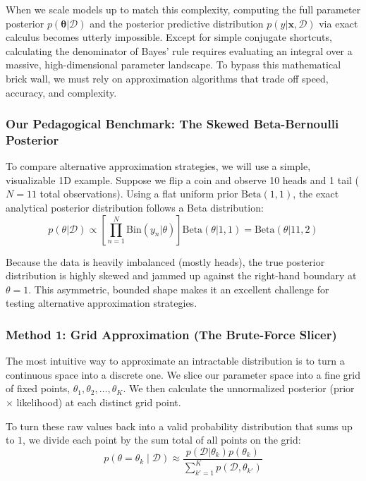 \documentclass{article}
\begin{document}
When we scale models up to match this complexity, computing the full parameter posterior $p(\boldsymbol{\theta}|\mathcal{D})$ and the posterior predictive distribution $p(y|\mathbf{x}, \mathcal{D})$ via exact calculus becomes utterly impossible. Except for simple conjugate shortcuts, calculating the denominator of Bayes' rule requires evaluating an integral over a massive, high-dimensional parameter landscape. To bypass this mathematical brick wall, we must rely on approximation algorithms that trade off speed, accuracy, and complexity.

\subsubsection{Our Pedagogical Benchmark: The Skewed Beta-Bernoulli Posterior}
To compare alternative approximation strategies, we will use a simple, visualizable 1D example. Suppose we flip a coin and observe 10 heads and 1 tail ($N = 11$ total observations). Using a flat uniform prior $\text{Beta}(1,1)$, the exact analytical posterior distribution follows a Beta distribution:
\begin{equation}
p(\theta|\mathcal{D}) \propto \left[ \prod_{n=1}^{N} \text{Bin}(y_n|\theta) \right] \text{Beta}(\theta|1, 1) = \text{Beta}(\theta|11, 2)
\end{equation}

Because the data is heavily imbalanced (mostly heads), the true posterior distribution is highly skewed and jammed up against the right-hand boundary at $\theta = 1$. This asymmetric, bounded shape makes it an excellent challenge for testing alternative approximation strategies.

\subsubsection{Method 1: Grid Approximation (The Brute-Force Slicer)}
The most intuitive way to approximate an intractable distribution is to turn a continuous space into a discrete one. We slice our parameter space into a fine grid of fixed points, $\theta_1, \theta_2, \dots, \theta_K$. We then calculate the unnormalized posterior (prior $\times$ likelihood) at each distinct grid point.

To turn these raw values back into a valid probability distribution that sums up to $1$, we divide each point by the sum total of all points on the grid:
\begin{equation}
p(\theta = \theta_k \mid \mathcal{D}) \approx \frac{p(\mathcal{D}|\theta_k)p(\theta_k)}{\sum_{k'=1}^{K} p(\mathcal{D}, \theta_{k'})}
\end{equation}
\end{document}
